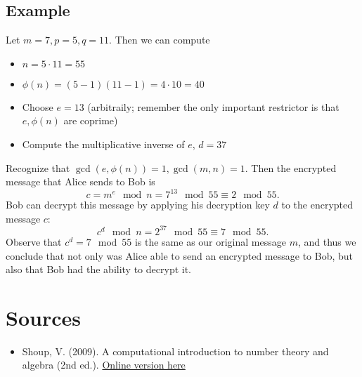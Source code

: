 \documentclass{exam}
\begin{document}
\subsection*{Example}
Let $m = 7, p = 5, q = 11$. Then we can compute
\begin{itemize}
    \item $n = 5 \cdot 11 = 55$
    \item $\phi(n) = (5 - 1)(11 - 1) = 4\cdot 10 = 40$
    \item Choose $e = 13$ (arbitraily; remember the only important restrictor is that $e, \phi(n)$ are coprime)
    \item Compute the multiplicative inverse of $e$, $d = 37$
\end{itemize}
Recognize that $\gcd(e, \phi(n)) = 1, \gcd(m, n) = 1$. Then the encrypted message that Alice sends to Bob is
$$c = m^e\mod n = 7^{13} \mod 55 \equiv 2 \mod 55.$$
Bob can decrypt this message by applying his decryption key $d$ to the encrypted message $c$:
$$c^d \mod n= 2^{37} \mod 55 \equiv 7 \mod 55.$$
Observe that $c^d = 7 \mod 55$ is the same as our original message $m$, and thus we conclude 
that not only was Alice able to send an encrypted message to Bob, but also that Bob had the ability
to decrypt it.

\section*{Sources}
\begin{itemize}
    \renewcommand\labelitemi{}
    \item Shoup, V. (2009). A computational introduction to number theory and algebra (2nd ed.). \href{https://shoup.net/ntb/}{Online version here}
\end{itemize}
\end{document}
